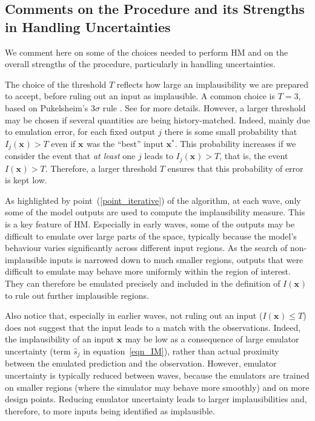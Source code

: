 \documentclass[preprint,12pt, sort&compress]{elsarticle}
\newcommand{\bd}[1]{\boldsymbol{#1}}
\newcommand{\x}[1][]{\bd{x_{#1}}}
\begin{document}

\subsection{Comments on the Procedure and its Strengths in Handling Uncertainties}
\label{Subsec_HM_comments}

We comment here on some of the choices needed to perform HM and on the overall strengths of the procedure, particularly in handling uncertainties.

The choice of the threshold $T$ reflects how large an implausibility we are prepared to accept, before ruling out an input as implausible. A common choice is $T=3$, based on Pukelsheim’s $3\sigma$ rule \cite{3sigma}. See \cite{vernon2010galaxy} for more details. 
However, a larger threshold may be chosen if several quantities are being history-matched. Indeed, mainly due to emulation error, for each fixed output $j$ there is some small probability that $I_j(\x) > T$ even if $\x$ was the ``best'' input $\bd{x^*}$. This probability increases if we consider the event that \emph{at least} one $j$ leads to $I_j(\x)>T$, that is, the event $I(\x)>T$. Therefore, a larger threshold $T$ ensures that this probability of error is kept low.

As highlighted by point~(\ref{point_iterative}) of the algorithm, at each wave, only some of the model outputs are used to compute the implausibility measure. This is a key feature of HM. Especially in early waves, some of the outputs may be difficult to emulate over large parts of the space, typically because the model’s behaviour varies significantly across different input regions. As the search of non-implausible inputs is narrowed down to much smaller regions, outputs that were difficult to emulate may behave more uniformly within the region of interest. They can therefore be emulated precisely and included in the definition of $I(\x)$ to rule out further implausible regions. 

Also notice that, especially in earlier waves, not ruling out an input ($I(\x)\leq T$) does not suggest that the input leads to a match with the observations. Indeed, the implausibility of an input $\x$ may be low as a consequence of large emulator uncertainty (term $\hat s_j$ in equation~\eqref{eqn_IM}), rather than actual proximity between the emulated prediction and the observation. However, emulator uncertainty is typically reduced between waves, because the emulators are trained on smaller regions (where the simulator may behave more smoothly) and on more design points. Reducing emulator uncertainty leads to larger implausibilities and, therefore, to more inputs being identified as implausible. 
\end{document}
